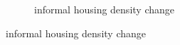 \documentclass[12pt]{article}
\begin{document}
\begin{figure}[h!]
\begin{subfigure}[b]{0.495\textwidth}
            \caption[]%
            {{\small informal housing density change}}    
            \label{fig:infchange}
        \end{subfigure}
        \label{fig:rawbblumeanschange}
        \vspace{-6mm}
    \end{figure} 
\end{document}
